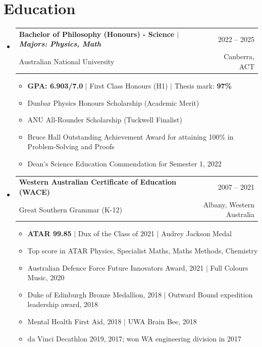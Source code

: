 \documentclass[A4,11pt]{article}
\makeatletter
\newcommand{\CVItem}[1]{
  \item\small{
    {#1 \vspace{-2pt}}
  }
}
\newcommand{\CVSubheading}[4]{
  \vspace{-2pt}\item
    \begin{tabular*}{0.97\textwidth}[t]{l@{\extracolsep{\fill}}r}
      \textbf{#1} & #2 \\
      \small#3 & \small #4 \\
    \end{tabular*}\vspace{-7pt}
}
\newcommand{\CVSubHeadingListStart}{\begin{itemize}[leftmargin=0.5cm, label={}]}
\newcommand{\CVSubHeadingListEnd}{\end{itemize}}
\newcommand{\CVItemListStart}{\begin{itemize}}
\newcommand{\CVItemListEnd}{\end{itemize}\vspace{-5pt}}
\makeatother
\begin{document}

\section{Education}
  \CVSubHeadingListStart
    \CVSubheading
    {{Bachelor of Philosophy (Honours) - Science $|$ \emph{\small{Majors: Physics, Math}}}}{2022 -- 2025}
    {Australian National University}{Canberra, ACT}
    \CVItemListStart
    \CVItem{\textbf{GPA: 6.903/7.0} $|$ {First Class Honours (H1)} $|$ Thesis mark: \textbf{97\%}}
    \CVItem{Dunbar Physics Honours Scholarship (Academic Merit)}
    \CVItem{ANU All-Rounder Scholarship (Tuckwell Finalist)}
    \CVItem{Bruce Hall Outstanding Achievement Award for attaining 100\% in Problem-Solving and Proofs }
    \CVItem{Dean’s Science Education Commendation for Semester 1, 2022}
    \CVItemListEnd
    \CVSubheading
        {Western Australian Certificate of Education (WACE)}{2007 -- 2021}
        {Great Southern Grammar (K-12)}{Albany, Western Australia}
        \CVItemListStart
	\CVItem{\textbf{ATAR 99.85} $|$ {Dux of the Class of 2021} $|$ Audrey Jackson Medal}
        \CVItem{Top score in ATAR Physics, Specialist Maths, Maths Methods, Chemistry }
        \CVItem{Australian Defence Force Future Innovators Award, 2021 $|$ Full Colours Music, 2020 }
        \CVItem{Duke of Edinburgh Bronze Medallion, 2018 $|$ Outward Bound expedition leadership award, 2018 }
	\CVItem{Mental Health First Aid, 2018 $|$ UWA Brain Bee, 2018}
        \CVItem{da Vinci Decathlon 2019, 2017; won WA engineering division in 2017 }
        \CVItemListEnd
  \CVSubHeadingListEnd
\end{document}
